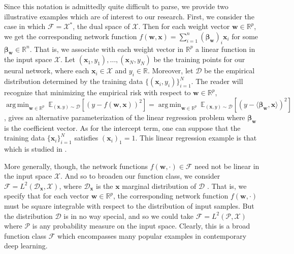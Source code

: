 \documentclass{article}
\DeclareMathOperator*{\argmin}{arg\,min}
\begin{document}
Since this notation is admittedly quite difficult to parse, we provide two illustrative examples which are of interest to our research. First, we consider the case in which $\mathcal{F} = \mathcal{X}^*$, the dual space of $\mathcal{X}$. Then for each weight vector $\boldsymbol{w} \in \mathbb{R}^p$, we get the corresponding network function $f(\boldsymbol{w}, \boldsymbol{x}) = \sum_{i=1}^n (\boldsymbol{\beta}_{\boldsymbol{w}})_i\boldsymbol{x}_i$ for some $\boldsymbol{\beta}_{\boldsymbol{w}} \in \mathbb{R}^n$. That is, we associate with each weight vector in $\mathbb{R}^p$ a linear function in the input space $\mathcal{X}$. Let $(\boldsymbol{x}_1, y_1), \ldots, (\boldsymbol{x}_N, y_N)$ be the training points for our neural network, where each $\boldsymbol{x}_i \in \mathcal{X}$ and $y_i \in \mathbb{R}$. Moreover, let $\mathcal{D}$ be the empirical distribution determined by the training data $\{(\boldsymbol{x}_i, y_i) \}_{i=1}^N$. The reader will recognize that minimizing the empirical risk with respect to $\boldsymbol{w} \in \mathbb{R}^p$, $\argmin_{\boldsymbol{w} \in \mathbb{R}^p} \  \mathbb{E}_{(\boldsymbol{x}, y) \sim \mathcal{D}}\left[\left(y - f(\boldsymbol{w}, \boldsymbol{x}) \right)^2 \right] = \argmin_{\boldsymbol{w} \in \mathbb{R}^p} \ \mathbb{E}_{(\boldsymbol{x}, y) \sim \mathcal{D}}\left[\left(y - \langle \boldsymbol{\beta}_{\boldsymbol{w}}, \boldsymbol{x} \rangle \right)^2 \right]$, gives an alternative parameterization of the linear regression problem where $\boldsymbol{\beta}_{\boldsymbol{w}}$ is the coefficient vector. As for the intercept term, one can suppose that the training data $\{ \boldsymbol{x}_i \}_{i=1}^N$ satisfies $(\boldsymbol{x}_i)_1 = 1$. This linear regression example is that which is studied in \cite{woodworth2020kernel}. 

More generally, though, the network functions $f(\boldsymbol{w}, \cdot) \in \mathcal{F}$ need not be linear in the input space $\mathcal{X}$. And so to broaden our function class, we consider $\mathcal{F} = L^2(\mathcal{D}_{\boldsymbol{x}}, \mathcal{X})$, where $\mathcal{D}_{\boldsymbol{x}}$ is the $\boldsymbol{x}$ marginal distribution of $\mathcal{D}$ \cite{chizat2018lazy}. That is, we specify that for each vector $\boldsymbol{w} \in \mathbb{R}^p$, the corresponding network function $f(\boldsymbol{w}, \cdot)$ must be square integrable with respect to the distribution of input samples. But the distribution $\mathcal{D}$ is in no way special, and so we could take $\mathcal{F} = L^2(\mathcal{P}, \mathcal{X})$ where $\mathcal{P}$ is any probability measure on the input space. Clearly, this is a broad function class $\mathcal{F}$ which encompasses many popular examples in contemporary deep learning.
\end{document}
